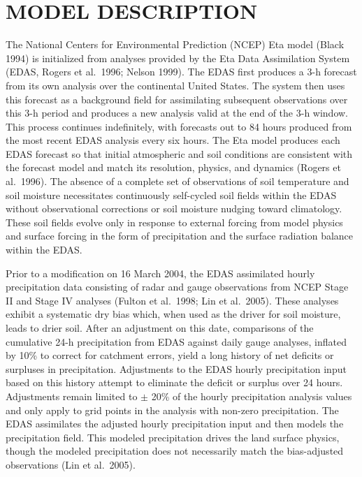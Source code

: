 \documentclass[twocolumn]{article}
\begin{document}
\section{{\normalsize \hspace{-0.195in} {\textbf{
MODEL DESCRIPTION
}}}} \vspace{-1.6mm}
\label{etacomp_desc.sec}
The National Centers for Environmental Prediction (NCEP) Eta model (Black 1994) is initialized from analyses provided by the Eta Data Assimilation System (EDAS, Rogers et al.\ 1996; Nelson 1999).  The EDAS first produces a 3-h forecast from its own analysis over the continental United States. The system then uses this forecast as a background field for assimilating subsequent observations over this 3-h period and produces a new analysis valid at the end of the 3-h window.  This process continues indefinitely, with forecasts out to 84 hours produced from the most recent EDAS analysis every six hours.  The Eta model produces each EDAS forecast so that initial atmospheric and soil conditions are consistent with the forecast model and match its resolution, physics, and dynamics (Rogers et al.\ 1996).  The absence of a complete set of observations of soil temperature and soil moisture necessitates continuously self-cycled soil fields within the EDAS without observational corrections or soil moisture nudging toward climatology.  These soil fields evolve only in response to external forcing from model physics and surface forcing in the form of precipitation and the surface radiation balance within the EDAS.

Prior to a modification on 16 March 2004, the EDAS assimilated hourly precipitation data consisting of radar and gauge observations from NCEP Stage II and Stage IV analyses (Fulton et al.\ 1998; Lin et al.\ 2005). These analyses exhibit a systematic dry bias which, when used as the driver for soil moisture, leads to drier soil.  After an adjustment on this date, comparisons of the cumulative 24-h precipitation from EDAS against daily gauge analyses, inflated by 10\% to correct for catchment errors, yield a long history of net deficits or surpluses in precipitation.  Adjustments to the EDAS hourly precipitation input based on this history attempt to eliminate the deficit or surplus over 24 hours.  Adjustments remain limited to $\pm$ 20\% of the hourly precipitation analysis values and only apply to grid points in the analysis with non-zero precipitation.  The EDAS assimilates the adjusted hourly precipitation input and then models the precipitation field.  This modeled precipitation drives the land surface physics, though the modeled precipitation does not necessarily match the bias-adjusted observations (Lin et al.\ 2005).  
\end{document}

